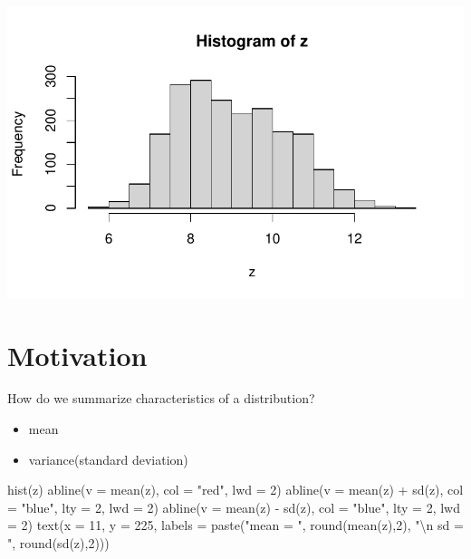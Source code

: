 \documentclass[
  letterpaper,
  DIV=11,
  numbers=noendperiod]{scrreprt}
\newenvironment{Shaded}{\begin{snugshade}}{\end{snugshade}}
\newcommand{\AttributeTok}[1]{\textcolor[rgb]{0.40,0.45,0.13}{#1}}
\newcommand{\DecValTok}[1]{\textcolor[rgb]{0.68,0.00,0.00}{#1}}
\newcommand{\FunctionTok}[1]{\textcolor[rgb]{0.28,0.35,0.67}{#1}}
\newcommand{\NormalTok}[1]{\textcolor[rgb]{0.00,0.23,0.31}{#1}}
\newcommand{\SpecialCharTok}[1]{\textcolor[rgb]{0.37,0.37,0.37}{#1}}
\newcommand{\StringTok}[1]{\textcolor[rgb]{0.13,0.47,0.30}{#1}}
\begin{document}
\includegraphics{LectureNotes/Lecture2_files/figure-pdf/unnamed-chunk-8-1.pdf}

\section{Motivation}\label{motivation-1}

How do we summarize characteristics of a distribution?

\begin{itemize}
\item
  mean
\item
  variance(standard deviation)
\end{itemize}

\begin{Shaded}
\begin{Highlighting}[]
\FunctionTok{hist}\NormalTok{(z)}
\FunctionTok{abline}\NormalTok{(}\AttributeTok{v =} \FunctionTok{mean}\NormalTok{(z), }\AttributeTok{col =} \StringTok{"red"}\NormalTok{, }\AttributeTok{lwd =} \DecValTok{2}\NormalTok{)}
\FunctionTok{abline}\NormalTok{(}\AttributeTok{v =} \FunctionTok{mean}\NormalTok{(z) }\SpecialCharTok{+} \FunctionTok{sd}\NormalTok{(z), }\AttributeTok{col =} \StringTok{"blue"}\NormalTok{, }\AttributeTok{lty =} \DecValTok{2}\NormalTok{, }\AttributeTok{lwd =} \DecValTok{2}\NormalTok{)}
\FunctionTok{abline}\NormalTok{(}\AttributeTok{v =} \FunctionTok{mean}\NormalTok{(z) }\SpecialCharTok{{-}} \FunctionTok{sd}\NormalTok{(z), }\AttributeTok{col =} \StringTok{"blue"}\NormalTok{, }\AttributeTok{lty =} \DecValTok{2}\NormalTok{, }\AttributeTok{lwd =} \DecValTok{2}\NormalTok{)}
\FunctionTok{text}\NormalTok{(}\AttributeTok{x =} \DecValTok{11}\NormalTok{, }\AttributeTok{y =} \DecValTok{225}\NormalTok{, }
     \AttributeTok{labels =} \FunctionTok{paste}\NormalTok{(}\StringTok{"mean = "}\NormalTok{, }\FunctionTok{round}\NormalTok{(}\FunctionTok{mean}\NormalTok{(z),}\DecValTok{2}\NormalTok{), }
                    \StringTok{"}\SpecialCharTok{\textbackslash{}n}\StringTok{ sd = "}\NormalTok{, }\FunctionTok{round}\NormalTok{(}\FunctionTok{sd}\NormalTok{(z),}\DecValTok{2}\NormalTok{)))}
\end{Highlighting}
\end{Shaded}
\end{document}
